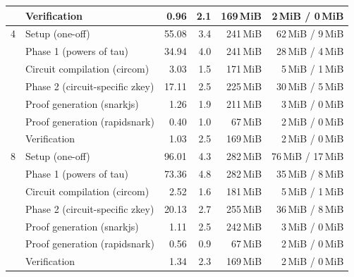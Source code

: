 \begin{table}[t]
{\begin{tabular}{|r|l|r|r|r|r|}
 & Verification & 0.96 & 2.1 & 169\,MiB & 2\,MiB / 0\,MiB \\
\hline
4 & Setup (one-off) & 55.08 & 3.4 & 241\,MiB & 62\,MiB / 9\,MiB \\
 & \quad Phase 1 (powers of tau) & 34.94 & 4.0 & 241\,MiB & 28\,MiB / 4\,MiB \\
 & \quad Circuit compilation (circom) & 3.03 & 1.5 & 171\,MiB & 5\,MiB / 1\,MiB \\
 & \quad Phase 2 (circuit-specific zkey) & 17.11 & 2.5 & 225\,MiB & 30\,MiB / 5\,MiB \\
 & Proof generation (snarkjs) & 1.26 & 1.9 & 211\,MiB & 3\,MiB / 0\,MiB \\
 & Proof generation (rapidsnark) & 0.40 & 1.0 & 67\,MiB & 2\,MiB / 0\,MiB \\
 & Verification & 1.03 & 2.5 & 169\,MiB & 2\,MiB / 0\,MiB \\
\hline
8 & Setup (one-off) & 96.01 & 4.3 & 282\,MiB & 76\,MiB / 17\,MiB \\
 & \quad Phase 1 (powers of tau) & 73.36 & 4.8 & 282\,MiB & 35\,MiB / 8\,MiB \\
 & \quad Circuit compilation (circom) & 2.52 & 1.6 & 181\,MiB & 5\,MiB / 1\,MiB \\
 & \quad Phase 2 (circuit-specific zkey) & 20.13 & 2.7 & 255\,MiB & 36\,MiB / 8\,MiB \\
 & Proof generation (snarkjs) & 1.11 & 2.5 & 242\,MiB & 3\,MiB / 0\,MiB \\
 & Proof generation (rapidsnark) & 0.56 & 0.9 & 67\,MiB & 2\,MiB / 0\,MiB \\
 & Verification & 1.34 & 2.3 & 169\,MiB & 2\,MiB / 0\,MiB \\
\hline
\end{tabular}}
\end{table}
